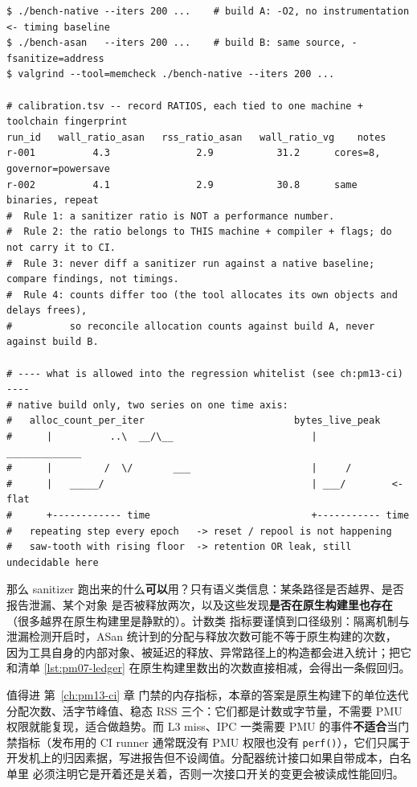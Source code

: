 \documentclass[12pt,a4paper,fontset=fandol]{ctexbook}
\newcommand{\Fn}[1]{\texttt{#1()}}
\newcommand{\Mx}[1]{\textsf{#1}}
\begin{document}
\begin{lstlisting}[style=outstyle, caption={倍率标定与趋势门禁的形态示意（格式示例，非本仓库实测值；所有数字都是占位符，只说明记录格式与读图规则）}, label={lst:pm07-calib}]
$ ./bench-native --iters 200 ...    # build A: -O2, no instrumentation  <- timing baseline
$ ./bench-asan   --iters 200 ...    # build B: same source, -fsanitize=address
$ valgrind --tool=memcheck ./bench-native --iters 200 ...

# calibration.tsv -- record RATIOS, each tied to one machine + toolchain fingerprint
run_id   wall_ratio_asan   rss_ratio_asan   wall_ratio_vg    notes
r-001          4.3               2.9           31.2      cores=8, governor=powersave
r-002          4.1               2.9           30.8      same binaries, repeat
#  Rule 1: a sanitizer ratio is NOT a performance number.
#  Rule 2: the ratio belongs to THIS machine + compiler + flags; do not carry it to CI.
#  Rule 3: never diff a sanitizer run against a native baseline; compare findings, not timings.
#  Rule 4: counts differ too (the tool allocates its own objects and delays frees),
#          so reconcile allocation counts against build A, never against build B.

# ---- what is allowed into the regression whitelist (see ch:pm13-ci) ----
# native build only, two series on one time axis:
#   alloc_count_per_iter                          bytes_live_peak
#      |          ..\  __/\__                        |      _____________
#      |         /  \/       ___                     |     /
#      |   _____/                                    | ___/        <- flat
#      +------------ time                            +----------- time
#   repeating step every epoch   -> reset / repool is not happening
#   saw-tooth with rising floor  -> retention OR leak, still undecidable here
\end{lstlisting}

那么 sanitizer 跑出来的什么\textbf{可以}用？只有语义类信息：某条路径是否越界、是否报告泄漏、某个对象
是否被释放两次，以及这些发现\textbf{是否在原生构建里也存在}（很多越界在原生构建里是静默的）。计数类
指标要谨慎到口径级别：隔离机制与泄漏检测开启时，ASan 统计到的分配与释放次数可能不等于原生构建的次数，
因为工具自身的内部对象、被延迟的释放、异常路径上的构造都会进入统计；把它和清单
\ref{lst:pm07-ledger} 在原生构建里数出的次数直接相减，会得出一条假回归。

值得进 第~\ref{ch:pm13-ci} 章 门禁的内存指标，本章的答案是原生构建下的单位迭代分配次数、活字节峰值、稳态
\Mx{RSS} 三个：它们都是计数或字节量，不需要 PMU 权限就能复现，适合做趋势。而 \Mx{L3 miss}、\Mx{IPC}
一类需要 PMU 的事件\textbf{不适合}当门禁指标（发布用的 CI runner 通常既没有 PMU 权限也没有
\Fn{perf}），它们只属于开发机上的归因素据，写进报告但不设阈值。分配器统计接口如果自带成本，白名单里
必须注明它是开着还是关着，否则一次接口开关的变更会被读成性能回归。
\end{document}
